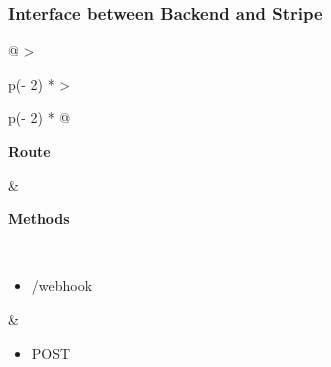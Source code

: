 
\subsubsection{Interface between Backend and Stripe}

\begin{longtable}[]{@{}
    >{\raggedright\arraybackslash}p{(\columnwidth - 2\tabcolsep) * }
    >{\raggedright\arraybackslash}p{(\columnwidth - 2\tabcolsep) * }@{}}
\toprule
\begin{minipage}[b]{\linewidth}\raggedright
\textbf{Route}
\end{minipage} & \begin{minipage}[b]{\linewidth}\raggedright
\textbf{Methods}
\end{minipage} \\
\midrule
\endhead
\begin{itemize}
    \item /webhook
\end{itemize} &
\begin{itemize}
    \item POST
\end{itemize} \\
\bottomrule
\end{longtable}

